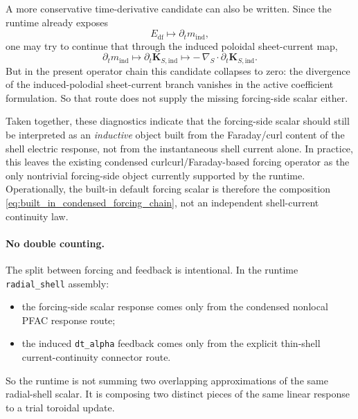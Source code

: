 \documentclass[11pt,a4paper]{article}
\begin{document}
A more conservative time-derivative candidate can also be written. Since the
runtime already exposes
\[
E_{\mathrm{df}} \mapsto \partial_t m_{\mathrm{ind}},
\]
one may try to continue that through the induced poloidal sheet-current map,
\[
\partial_t m_{\mathrm{ind}}
\mapsto
\partial_t \mathbf K_{S,\mathrm{ind}}
\mapsto
-\,\nabla_S\!\cdot \partial_t \mathbf K_{S,\mathrm{ind}}.
\]
But in the present operator chain this candidate collapses to zero: the
divergence of the induced-polodial sheet-current branch vanishes in the active
coefficient formulation. So that route does not supply the missing forcing-side
scalar either.

Taken together, these diagnostics indicate that the forcing-side scalar should
still be interpreted as an \emph{inductive} object built from the Faraday/curl
content of the shell electric response, not from the instantaneous shell
current alone. In practice, this leaves the existing condensed
curlcurl/Faraday-based forcing operator as the only nontrivial forcing-side
object currently supported by the runtime. Operationally, the built-in default
forcing scalar is therefore the composition
\eqref{eq:built_in_condensed_forcing_chain}, not an independent shell-current
continuity law.

\paragraph{No double counting.}
The split between forcing and feedback is intentional. In the runtime
\texttt{radial\_shell} assembly:
\begin{itemize}
\item the forcing-side scalar response comes only from the condensed nonlocal
PFAC response route;
\item the induced \texttt{dt\_alpha} feedback comes only from the explicit
thin-shell current-continuity connector route.
\end{itemize}
So the runtime is not summing two overlapping approximations of the same
radial-shell scalar. It is composing two distinct pieces of the same linear
response to a trial toroidal update.
\end{document}
